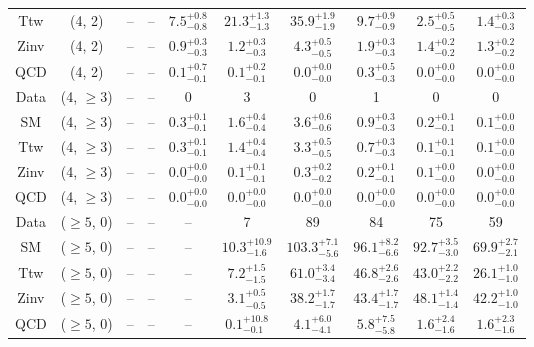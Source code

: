 \begin{table}[h!]
{\begin{tabular}{cccccccccc}
	Ttw & (4, 2) & -- & -- & $7.5^{+ 0.8 }_{- 0.8 }$ & $21.3^{+ 1.3 }_{- 1.3 }$ & $35.9^{+ 1.9 }_{- 1.9 }$ & $9.7^{+ 0.9 }_{- 0.9 }$ & $2.5^{+ 0.5 }_{- 0.5 }$ & $1.4^{+ 0.3 }_{- 0.3 }$ \\[0.5ex] 
	Zinv & (4, 2) & -- & -- & $0.9^{+ 0.3 }_{- 0.3 }$ & $1.2^{+ 0.3 }_{- 0.3 }$ & $4.3^{+ 0.5 }_{- 0.5 }$ & $1.9^{+ 0.3 }_{- 0.3 }$ & $1.4^{+ 0.2 }_{- 0.2 }$ & $1.3^{+ 0.2 }_{- 0.2 }$ \\[0.5ex] 
	QCD & (4, 2) & -- & -- & $0.1^{+ 0.7 }_{- 0.1 }$ & $0.1^{+ 0.2 }_{- 0.1 }$ & $0.0^{+ 0.0 }_{- 0.0 }$ & $0.3^{+ 0.5 }_{- 0.3 }$ & $0.0^{+ 0.0 }_{- 0.0 }$ & $0.0^{+ 0.0 }_{- 0.0 }$ \\[0.5ex] 
	Data & (4, $\ge3$) & -- & -- & 0 & 3 & 0 & 1 & 0 & 0 \\[0.5ex] 
	SM & (4, $\ge3$) & -- & -- & $0.3^{+ 0.1 }_{- 0.1 }$ & $1.6^{+ 0.4 }_{- 0.4 }$ & $3.6^{+ 0.6 }_{- 0.6 }$ & $0.9^{+ 0.3 }_{- 0.3 }$ & $0.2^{+ 0.1 }_{- 0.1 }$ & $0.1^{+ 0.0 }_{- 0.0 }$ \\[0.5ex] 
	Ttw & (4, $\ge3$) & -- & -- & $0.3^{+ 0.1 }_{- 0.1 }$ & $1.4^{+ 0.4 }_{- 0.4 }$ & $3.3^{+ 0.5 }_{- 0.5 }$ & $0.7^{+ 0.3 }_{- 0.3 }$ & $0.1^{+ 0.1 }_{- 0.1 }$ & $0.1^{+ 0.0 }_{- 0.0 }$ \\[0.5ex] 
	Zinv & (4, $\ge3$) & -- & -- & $0.0^{+ 0.0 }_{- 0.0 }$ & $0.1^{+ 0.1 }_{- 0.1 }$ & $0.3^{+ 0.2 }_{- 0.2 }$ & $0.2^{+ 0.1 }_{- 0.1 }$ & $0.1^{+ 0.0 }_{- 0.0 }$ & $0.0^{+ 0.0 }_{- 0.0 }$ \\[0.5ex] 
	QCD & (4, $\ge3$) & -- & -- & $0.0^{+ 0.0 }_{- 0.0 }$ & $0.0^{+ 0.0 }_{- 0.0 }$ & $0.0^{+ 0.0 }_{- 0.0 }$ & $0.0^{+ 0.0 }_{- 0.0 }$ & $0.0^{+ 0.0 }_{- 0.0 }$ & $0.0^{+ 0.0 }_{- 0.0 }$ \\[0.5ex] 
	Data & ($\ge5$, 0) & -- & -- & -- & 7 & 89 & 84 & 75 & 59 \\[0.5ex] 
	SM & ($\ge5$, 0) & -- & -- & -- & $10.3^{+ 10.9 }_{- 1.6 }$ & $103.3^{+ 7.1 }_{- 5.6 }$ & $96.1^{+ 8.2 }_{- 6.6 }$ & $92.7^{+ 3.5 }_{- 3.0 }$ & $69.9^{+ 2.7 }_{- 2.1 }$ \\[0.5ex] 
	Ttw & ($\ge5$, 0) & -- & -- & -- & $7.2^{+ 1.5 }_{- 1.5 }$ & $61.0^{+ 3.4 }_{- 3.4 }$ & $46.8^{+ 2.6 }_{- 2.6 }$ & $43.0^{+ 2.2 }_{- 2.2 }$ & $26.1^{+ 1.0 }_{- 1.0 }$ \\[0.5ex] 
	Zinv & ($\ge5$, 0) & -- & -- & -- & $3.1^{+ 0.5 }_{- 0.5 }$ & $38.2^{+ 1.7 }_{- 1.7 }$ & $43.4^{+ 1.7 }_{- 1.7 }$ & $48.1^{+ 1.4 }_{- 1.4 }$ & $42.2^{+ 1.0 }_{- 1.0 }$ \\[0.5ex] 
	QCD & ($\ge5$, 0) & -- & -- & -- & $0.1^{+ 10.8 }_{- 0.1 }$ & $4.1^{+ 6.0 }_{- 4.1 }$ & $5.8^{+ 7.5 }_{- 5.8 }$ & $1.6^{+ 2.4 }_{- 1.6 }$ & $1.6^{+ 2.3 }_{- 1.6 }$ \\[0.5ex] 

\end{tabular}}
\end{table}
